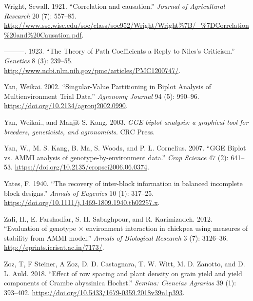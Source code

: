 \documentclass[
]{book}
\renewcommand{\chaptername}{Capítulo}
\numberwithin{equation}{section}
\newlength{\cslhangindent}
\newenvironment{cslreferences}%
  {\setlength{\parindent}{0pt}%
  \everypar{\setlength{\hangindent}{\cslhangindent}}\ignorespaces}%
  {\par}
\begin{document}
\begin{cslreferences}
\leavevmode\hypertarget{ref-Wright1921}{}%
Wright, Sewall. 1921. ``Correlation and causation.'' \emph{Journal of Agricultural Research} 20 (7): 557--85. \url{http://www.ssc.wisc.edu/soc/class/soc952/Wright/Wright\%7B/_\%7DCorrelation\%20and\%20Causation.pdf}.

\leavevmode\hypertarget{ref-Wright1923}{}%
---------. 1923. ``The Theory of Path Coefficients a Reply to Niles's Criticism.'' \emph{Genetics} 8 (3): 239--55. \url{http://www.ncbi.nlm.nih.gov/pmc/articles/PMC1200747/}.

\leavevmode\hypertarget{ref-Yan2002b}{}%
Yan, Weikai. 2002. ``Singular-Value Partitioning in Biplot Analysis of Multienvironment Trial Data.'' \emph{Agronomy Journal} 94 (5): 990--96. \url{https://doi.org/10.2134/agronj2002.0990}.

\leavevmode\hypertarget{ref-Yan2003}{}%
Yan, Weikai., and Manjit S. Kang. 2003. \emph{GGE biplot analysis: a graphical tool for breeders, geneticists, and agronomists}. CRC Press.

\leavevmode\hypertarget{ref-Yan2007}{}%
Yan, W., M. S. Kang, B. Ma, S. Woods, and P. L. Cornelius. 2007. ``GGE Biplot vs. AMMI analysis of genotype-by-environment data.'' \emph{Crop Science} 47 (2): 641--53. \url{https://doi.org/10.2135/cropsci2006.06.0374}.

\leavevmode\hypertarget{ref-Yates1940}{}%
Yates, F. 1940. ``The recovery of inter-block information in balanced incomplete block designs.'' \emph{Annals of Eugenics} 10 (1): 317--25. \url{https://doi.org/10.1111/j.1469-1809.1940.tb02257.x}.

\leavevmode\hypertarget{ref-Zali2012}{}%
Zali, H., E. Farshadfar, S. H. Sabaghpour, and R. Karimizadeh. 2012. ``Evaluation of genotype × environment interaction in chickpea using measures of stability from AMMI model.'' \emph{Annals of Biological Research} 3 (7): 3126--36. \url{http://eprints.icrisat.ac.in/7173/}.

\leavevmode\hypertarget{ref-Zoz2018}{}%
Zoz, T, F Steiner, A Zoz, D. D. Castagnara, T. W. Witt, M. D. Zanotto, and D. L. Auld. 2018. ``Effect of row spacing and plant density on grain yield and yield components of Crambe abyssinica Hochst.'' \emph{Semina: Ciencias Agrarias} 39 (1): 393--402. \url{https://doi.org/10.5433/1679-0359.2018v39n1p393}.
\end{cslreferences}

\hypertarget{appendix-apuxeandices}{%
\appendix}


\renewcommand{\chaptername}{Apêndice}
\end{document}
